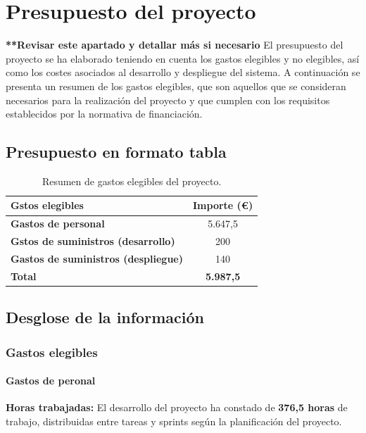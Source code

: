 \section{Presupuesto del proyecto}

\textbf{**Revisar este apartado y detallar más si necesario}
El presupuesto del proyecto se ha elaborado teniendo en cuenta los gastos elegibles y no elegibles, así como los costes asociados al desarrollo y despliegue del sistema. A continuación se presenta un resumen de los gastos elegibles, que son aquellos que se consideran necesarios para la realización del proyecto y que cumplen con los requisitos establecidos por la normativa de financiación.

\subsection{Presupuesto en formato tabla}

\begin{table}[H]
\centering
\begin{tabular}{|l|c|}
\hline
\textbf{Gstos elegibles} & \textbf{Importe (€)} \\ \hline
\textbf{Gastos de personal} & 5.647,5 \\ \hline
\textbf{Gstos de suministros (desarrollo)} & 200 \\ \hline
\textbf{Gastos de suministros (despliegue)} & 140 \\ \hline
\textbf{Total} & \textbf{5.987,5} \\ \hline
\end{tabular}
\caption{Resumen de gastos elegibles del proyecto.}
\label{tab:presupuesto}
\end{table}

\subsection{Desglose de la información}

\subsubsection{Gastos elegibles}

\paragraph{Gastos de peronal}

\textbf{Horas trabajadas:} El desarrollo del proyecto ha constado de \textbf{376,5 horas} de trabajo, distribuidas entre tareas y sprints según la planificación del proyecto.

